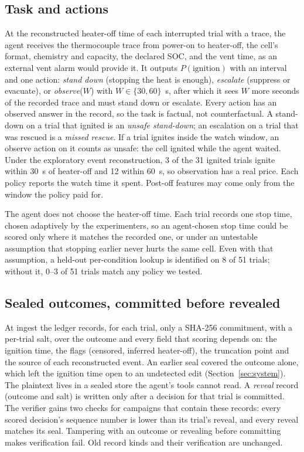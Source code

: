 \documentclass[11pt]{article}
\begin{document}
\subsection{Task and actions}
At the reconstructed heater-off time of each interrupted trial with a trace, the agent receives the thermocouple trace
from power-on to heater-off, the cell's format, chemistry and capacity, the declared SOC, and the vent time, as an
external vent alarm would provide it. It outputs $P(\text{ignition})$ with an interval and one action:
\emph{stand down} (stopping the heat is enough), \emph{escalate} (suppress or evacuate), or \emph{observe}($W$) with
$W \in \{30, 60\}$~s, after which it sees $W$ more seconds of the recorded trace and must stand down or escalate.
Every action has an observed answer in the record, so the task is factual, not counterfactual. A stand-down on a trial
that ignited is an \emph{unsafe stand-down}; an escalation on a trial that was rescued is a \emph{missed rescue}. If a
trial ignites inside the watch window, an observe action on it counts as unsafe: the cell ignited while the agent
waited. Under the exploratory event reconstruction, 3 of the 31 ignited trials ignite within 30~s of heater-off and 12
within 60~s, so observation has a real price. Each policy reports the watch time it spent. Post-off features may come
only from the window the policy paid for.

The agent does not choose the heater-off time. Each trial records one stop time, chosen adaptively by the
experimenters, so an agent-chosen stop time could be scored only where it matches the recorded one, or under an
untestable assumption that stopping earlier never hurts the same cell. Even with that assumption, a held-out per-condition
lookup is identified on 8 of 51 trials; without it, 0--3 of 51 trials match any policy we tested.

\subsection{Sealed outcomes, committed before revealed}
At ingest the ledger records, for each trial, only a SHA-256 commitment, with a per-trial salt, over the outcome and
every field that scoring depends on: the ignition time, the flags (censored, inferred heater-off), the truncation
point and the source of each reconstructed event. An earlier seal covered the outcome alone, which left the ignition
time open to an undetected edit (Section~\ref{sec:system}). The plaintext lives in a sealed store the agent's tools
cannot read. A \emph{reveal} record (outcome
and salt) is written only after a decision for that trial is committed. The verifier gains two checks for campaigns
that contain these records: every scored decision's sequence number is lower than its trial's reveal, and every reveal
matches its seal. Tampering with an outcome or revealing before committing makes verification fail. Old record kinds
and their verification are unchanged.
\end{document}
